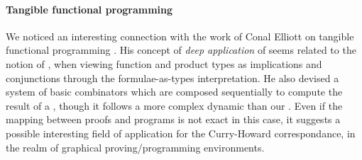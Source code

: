 
\paragraph{Tangible functional programming}

We noticed an interesting connection with the work of Conal Elliott on
tangible functional programming . His concept
of \emph{deep application} of  seems related to the
notion of , when viewing function and product types
as implications and conjunctions through the formulae-as-types
interpretation. He also devised a system of basic combinators which
are composed sequentially to compute the result of a , though it
follows a more complex dynamic than our . Even if the
mapping between proofs and programs is not exact in this case, it
suggests a possible interesting field of application for the
Curry-Howard correspondance, in the realm of graphical
proving/programming environments.
